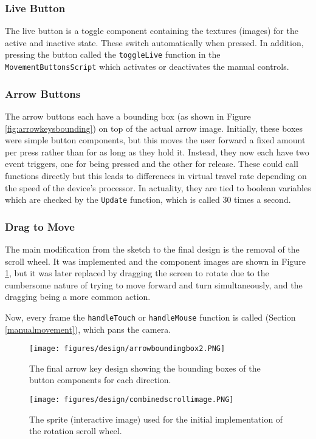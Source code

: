 \documentclass[12pt, a4paper]{article}
\begin{document}
\newpage
\subsubsection{Live Button}
The live button is a toggle component containing the textures (images) for the active and inactive state. These switch automatically when pressed. In addition, pressing the button called the \verb|toggleLive| function in the \verb|MovementButtonsScript| which activates or deactivates the manual controls.

\subsubsection{Arrow Buttons}
The arrow buttons each have a bounding box (as shown in Figure \ref{fig:arrowkeysbounding}) on top of the actual arrow image. Initially, these boxes were simple button components, but this moves the user forward a fixed amount per press rather than for as long as they hold it. Instead, they now each have two event triggers, one for being pressed and the other for release. These could call functions directly but this leads to differences in virtual travel rate depending on the speed of the device's processor. In actuality, they are tied to boolean variables which are checked by the \verb|Update| function, which is called 30 times a second.

\subsubsection{Drag to Move}
The main modification from the sketch to the final design is the removal of the scroll wheel. It was implemented and the component images are shown in Figure \ref{fig:scroll}, but it was later replaced by dragging the screen to rotate due to the cumbersome nature of trying to move forward and turn simultaneously, and the dragging being a more common action.

Now, every frame the \verb|handleTouch| or \verb|handleMouse| function is called (Section \ref{manualmovement}), which pans the camera.

\begin{figure}[h]
\begin{minipage}{.48\textwidth}
  \centering
  \texttt{[image: figures/design/arrowboundingbox2.PNG]}
  \caption{The final arrow key design showing the bounding boxes of the button components for each direction.}
  \label{fig:arrowkeysbounding}
\end{minipage}
\begin{minipage}{.04\textwidth}
  \hspace{0.1cm}
\end{minipage}
\begin{minipage}{.5\textwidth}
  \centering
  \texttt{[image: figures/design/combinedscrollimage.PNG]}
  \caption{The sprite (interactive image) used for the initial implementation of the rotation scroll wheel.}
  \label{fig:scroll}
\end{minipage}
\end{figure}
\end{document}
